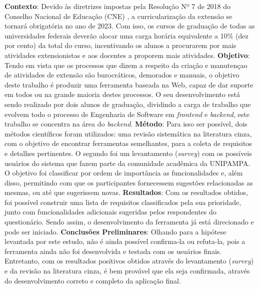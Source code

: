 \begin{resumo}

\textbf{Contexto}: Devido às diretrizes impostas pela Resolução Nº 7 de 2018 do Conselho Nacional de Educação (CNE) \cite{Resolucao-MEC:2018}, a curricularização da extensão se tornará obrigatória no ano de 2023. Com isso, os cursos de graduação de todas as universidades federais deverão alocar uma carga horária equivalente a 10\% (dez por cento) da total do curso, incentivando os alunos a procurarem por mais atividades extensionistas e aos docentes a proporem mais atividades.
\textbf{Objetivo}: Tendo em vista que os processos que dizem a respeito da criação e manutençao de atividades de extensão são burocráticos, demorados e manuais, o objetivo deste trabalho é produzir uma ferramenta baseada na Web, capaz de dar suporte em todos ou na grande maioria destes processos. O seu desenvolvimento está sendo realizado por dois alunos de graduação, dividindo a carga de trabalho que evolvem todo o processo de Engenharia de Software em \textit{frontend} e \textit{backend}, este trabalho se concentra na área do \textit{backend}.
\textbf{Método}: Para isso ser possível, dois métodos científicos foram utilizados:
uma revisão sistemática na literatura cinza, com o objetivo de encontrar ferramentas semelhantes, para a coleta de requisitos e detalhes pertinentes. O segundo foi um levantamento (\textit{survey}) com os possíveis usuários do sistema que fazem parte da comunidade acadêmica da UNIPAMPA. O objetivo foi classificar por ordem de importância as funcionalidades e, além disso, permitindo com que os participantes fornecessem sugestões relacionadas as mesmas, ou até que sugerissem novas. 
\textbf{Resultados}: Com os resultados obtidos, foi possível construir uma lista de requisitos classificados pela sua prioridade, junto com funcionalidades adicionais sugeridas pelos respondentes do questionário. Sendo assim, o desenvolvimento da ferramenta já está direcionado e pode ser iniciado.
\textbf{Conclusões Preliminares}: Olhando para a hipótese levantada por este estudo, não é ainda possível confirma-la ou refuta-la, pois a ferramenta ainda não foi desenvolvida e testada com os usuários finais. Entretanto, com os resultados positivos obtidos através do levantamento (\textit{survey}) e da revisão na literatura cinza, é bem provável que ela seja confirmada, através do desenvolvimento correto e completo da aplicação final.


\end{resumo}
